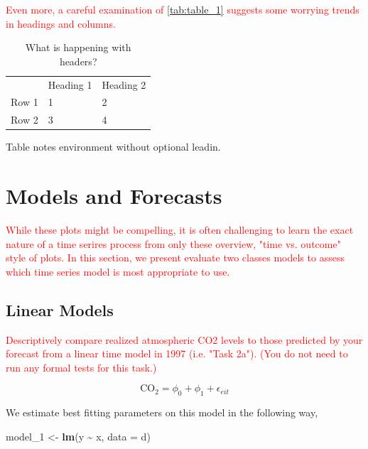\documentclass[AER]{AEA}
\newenvironment{Shaded}{\begin{snugshade}}{\end{snugshade}}
\newcommand{\AttributeTok}[1]{\textcolor[rgb]{0.13,0.29,0.53}{#1}}
\newcommand{\FunctionTok}[1]{\textcolor[rgb]{0.13,0.29,0.53}{\textbf{#1}}}
\newcommand{\NormalTok}[1]{#1}
\newcommand{\OtherTok}[1]{\textcolor[rgb]{0.56,0.35,0.01}{#1}}
\newcommand{\SpecialCharTok}[1]{\textcolor[rgb]{0.81,0.36,0.00}{\textbf{#1}}}
\begin{document}
\textcolor{red}{Even more, a careful examination of \autoref{tab:table_1} suggests some worrying trends in headings and columns. }

\begin{table}
  \caption{What is happening with headers?\label{tab:table_1}}
  \begin{tabular}{lll}
    \toprule 
    & Heading 1 & Heading 2 \\
    Row 1 & 1 & 2 \\
    Row 2 & 3 & 4 \\
    \bottomrule
  \end{tabular}
  \begin{tablenotes}
    Table notes environment without optional leadin.
  \end{tablenotes}
\end{table}

\hypertarget{models-and-forecasts}{%
\section{Models and Forecasts}\label{models-and-forecasts}}

\textcolor{red}{While these plots might be compelling, it is often challenging to learn the exact nature of a time serires process from only these overview, "time vs. outcome" style of plots. In this section, we present evaluate two classes models to assess which time series model is most appropriate to use. }

\hypertarget{linear-models}{%
\subsection{Linear Models}\label{linear-models}}

\textcolor{red}{Descriptively compare realized atmospheric CO2 levels to those predicted by your forecast from a linear time model in 1997 (i.e. "Task 2a"). (You do not need to run any formal tests for this task.) }

\begin{equation}
\label{eq:one}
\text{CO}_{2} = \phi_{0} + \phi_{1} + \epsilon_{eit}
\end{equation}

We estimate best fitting parameters on this model in the following way,

\begin{Shaded}
\begin{Highlighting}[]
\NormalTok{model\_1 }\OtherTok{\textless{}{-}} \FunctionTok{lm}\NormalTok{(y }\SpecialCharTok{\textasciitilde{}}\NormalTok{ x, }\AttributeTok{data =}\NormalTok{ d)}
\end{Highlighting}
\end{Shaded}
\end{document}
